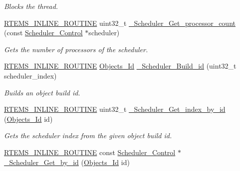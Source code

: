 \begin{DoxyCompactItemize}
\begin{DoxyCompactList}\small\item\em Blocks the thread. \end{DoxyCompactList}\item 
\mbox{\hyperlink{group__RTEMSScoreBaseDefs_gac216239df231d5dbd15e3520b0b9313f}{R\+T\+E\+M\+S\+\_\+\+I\+N\+L\+I\+N\+E\+\_\+\+R\+O\+U\+T\+I\+NE}} uint32\+\_\+t \mbox{\hyperlink{group__RTEMSScoreScheduler_gabc8aeee22cfaf3f6bf7d69b67d26635a}{\+\_\+\+Scheduler\+\_\+\+Get\+\_\+processor\+\_\+count}} (const \mbox{\hyperlink{struct__Scheduler__Control}{Scheduler\+\_\+\+Control}} $\ast$scheduler)
\begin{DoxyCompactList}\small\item\em Gets the number of processors of the scheduler. \end{DoxyCompactList}\item 
\mbox{\hyperlink{group__RTEMSScoreBaseDefs_gac216239df231d5dbd15e3520b0b9313f}{R\+T\+E\+M\+S\+\_\+\+I\+N\+L\+I\+N\+E\+\_\+\+R\+O\+U\+T\+I\+NE}} \mbox{\hyperlink{group__RTEMSScoreObject_ga5821f52a51072941bdd603e542d0863e}{Objects\+\_\+\+Id}} \mbox{\hyperlink{group__RTEMSScoreScheduler_ga5012b61871058535e8b6bfd316787fd7}{\+\_\+\+Scheduler\+\_\+\+Build\+\_\+id}} (uint32\+\_\+t scheduler\+\_\+index)
\begin{DoxyCompactList}\small\item\em Builds an object build id. \end{DoxyCompactList}\item 
\mbox{\hyperlink{group__RTEMSScoreBaseDefs_gac216239df231d5dbd15e3520b0b9313f}{R\+T\+E\+M\+S\+\_\+\+I\+N\+L\+I\+N\+E\+\_\+\+R\+O\+U\+T\+I\+NE}} uint32\+\_\+t \mbox{\hyperlink{group__RTEMSScoreScheduler_ga6a59bd6a442d2c5acf247c66e1b21757}{\+\_\+\+Scheduler\+\_\+\+Get\+\_\+index\+\_\+by\+\_\+id}} (\mbox{\hyperlink{group__RTEMSScoreObject_ga5821f52a51072941bdd603e542d0863e}{Objects\+\_\+\+Id}} id)
\begin{DoxyCompactList}\small\item\em Gets the scheduler index from the given object build id. \end{DoxyCompactList}\item 
\mbox{\hyperlink{group__RTEMSScoreBaseDefs_gac216239df231d5dbd15e3520b0b9313f}{R\+T\+E\+M\+S\+\_\+\+I\+N\+L\+I\+N\+E\+\_\+\+R\+O\+U\+T\+I\+NE}} const \mbox{\hyperlink{struct__Scheduler__Control}{Scheduler\+\_\+\+Control}} $\ast$ \mbox{\hyperlink{group__RTEMSScoreScheduler_ga11e0f3f90d983be6f067da9f518540c7}{\+\_\+\+Scheduler\+\_\+\+Get\+\_\+by\+\_\+id}} (\mbox{\hyperlink{group__RTEMSScoreObject_ga5821f52a51072941bdd603e542d0863e}{Objects\+\_\+\+Id}} id)

\end{DoxyCompactItemize}
